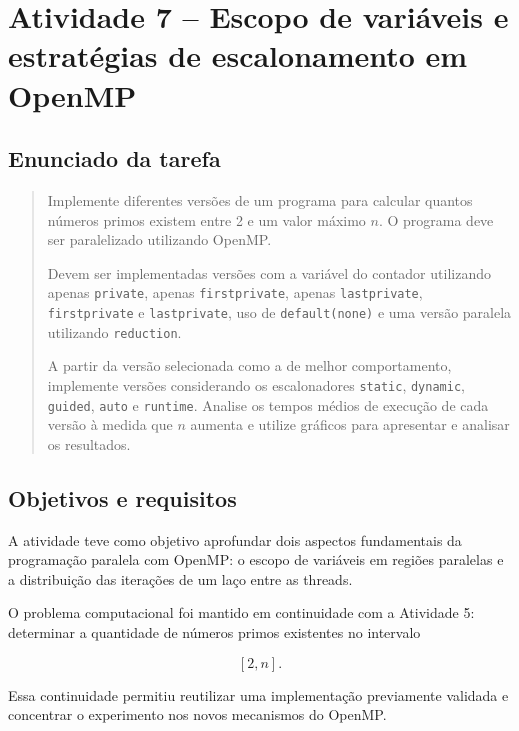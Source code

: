 \chapter{Atividade 7 -- Escopo de variáveis e estratégias de escalonamento em OpenMP}
\label{chap:atvd07}


\section{Enunciado da tarefa}
\label{sec:atvd07-enunciado}

\begin{quote}
Implemente diferentes versões de um programa para calcular quantos números
primos existem entre 2 e um valor máximo \(n\). O programa deve ser
paralelizado utilizando OpenMP.

Devem ser implementadas versões com a variável do contador utilizando apenas
\texttt{private}, apenas \texttt{firstprivate}, apenas
\texttt{lastprivate}, \texttt{firstprivate} e \texttt{lastprivate},
uso de \texttt{default(none)} e uma versão paralela utilizando
\texttt{reduction}.

A partir da versão selecionada como a de melhor comportamento, implemente
versões considerando os escalonadores \texttt{static}, \texttt{dynamic},
\texttt{guided}, \texttt{auto} e \texttt{runtime}. Analise os tempos médios
de execução de cada versão à medida que \(n\) aumenta e utilize gráficos
para apresentar e analisar os resultados.
\end{quote}


\section{Objetivos e requisitos}
\label{sec:atvd07-objetivos}

A atividade teve como objetivo aprofundar dois aspectos fundamentais da
programação paralela com OpenMP: o escopo de variáveis em regiões paralelas
e a distribuição das iterações de um laço entre as threads.

O problema computacional foi mantido em continuidade com a Atividade 5:
determinar a quantidade de números primos existentes no intervalo

\[
[2,n].
\]

Essa continuidade permitiu reutilizar uma implementação previamente
validada e concentrar o experimento nos novos mecanismos do OpenMP.


